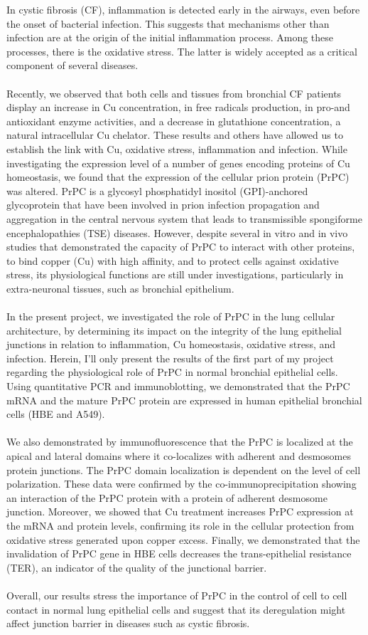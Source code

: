 In cystic fibrosis (CF), inflammation is detected early in the airways, even before the onset of bacterial infection. This suggests that mechanisms other than infection are at the origin of the initial inflammation process. Among these processes, there is the oxidative stress. The latter is widely accepted as a critical component of several diseases.\\
\\
Recently, we observed that both cells and tissues from bronchial CF patients display an increase in Cu concentration, in free radicals production, in pro-and antioxidant enzyme activities, and a decrease in glutathione concentration, a natural intracellular Cu chelator. These results and others have allowed us to establish the link with Cu, oxidative stress, inflammation and infection.
While investigating the expression level of a number of genes encoding proteins of Cu homeostasis, we found that the expression of the cellular prion protein (PrPC) was altered. PrPC is a glycosyl phosphatidyl inositol (GPI)-anchored glycoprotein that have been involved in prion infection propagation and aggregation in the central nervous system that leads to transmissible spongiforme encephalopathies (TSE) diseases. 
However, despite several in vitro and in vivo studies that demonstrated the capacity of PrPC to interact with other proteins, to bind copper (Cu) with high affinity, and to protect cells against oxidative stress, its physiological functions are still under investigations, particularly in extra-neuronal tissues, such as bronchial epithelium.\\ 
\\
In the present project, we investigated the role of PrPC in the lung cellular architecture, by determining its impact on the integrity of the lung epithelial junctions in relation to inflammation, Cu homeostasis, oxidative stress, and infection.
Herein, I’ll only present the results of the first part of my project regarding the physiological role of PrPC in normal bronchial epithelial cells. Using quantitative PCR and immunoblotting, we demonstrated that the PrPC mRNA and the mature PrPC protein are expressed in human epithelial bronchial cells (HBE and A549). \\
\\
We also demonstrated by immunofluorescence that the PrPC is localized at the apical and lateral domains where it co-localizes with adherent and desmosomes protein junctions. The PrPC domain localization is dependent on the level of cell polarization. These data were confirmed by the co-immunoprecipitation showing an interaction of the PrPC protein with a protein of adherent desmosome junction. Moreover, we showed that Cu treatment increases PrPC expression at the mRNA and protein levels, confirming its role in the cellular protection from oxidative stress generated upon copper excess. Finally, we demonstrated that the invalidation of PrPC gene in HBE cells decreases the trans-epithelial resistance (TER), an indicator of the quality of the junctional barrier. \\
\\
Overall, our results stress the importance of PrPC in the control of cell to cell contact in normal lung epithelial cells and suggest that its deregulation might affect junction barrier in diseases such as cystic fibrosis.


\endgroup

\vfill
